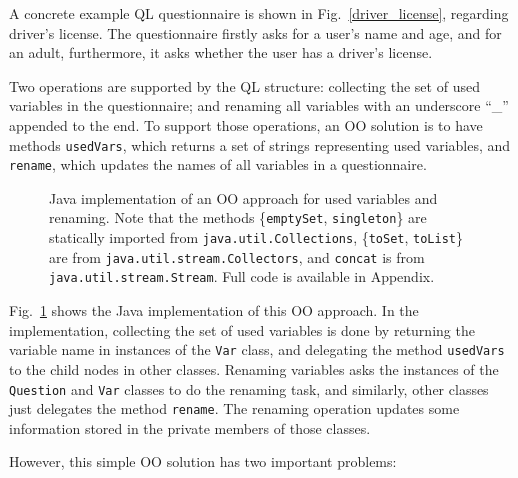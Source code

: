 A concrete example QL questionnaire is shown in Fig.~\ref{driver_license}, regarding driver's license. The questionnaire firstly asks for a user's name and age, and for an adult, furthermore, it asks whether the user has a driver's license.

Two operations are supported by the QL structure: collecting the set of used variables in the questionnaire; and renaming all variables with an underscore ``\_'' appended to the end. To support those operations, an OO solution is to have methods \lstinline{usedVars}, which returns a set of strings representing used variables, and \lstinline{rename}, which updates the names of all variables in a questionnaire.

\begin{figure}[t]
\nocaptionrule
\caption{Java implementation of an OO approach for used variables and renaming. Note that the methods \{\lstinline{emptySet}, \lstinline{singleton}\} are statically imported from \lstinline{java.util.Collections}, \{\lstinline{toSet}, \lstinline{toList}\} are from \lstinline{java.util.stream.Collectors}, and \lstinline{concat} is from \lstinline{java.util.stream.Stream}. Full code is available in Appendix.}
\label{ql_oo_approach}
\end{figure}

Fig.~\ref{ql_oo_approach} shows the Java implementation of this OO approach. In the implementation, collecting the set of used variables is done by returning the variable name in instances of the \lstinline{Var} class, and delegating the method \lstinline{usedVars} to the child nodes in other classes. Renaming variables asks the instances of the \lstinline{Question} and \lstinline{Var} classes to do the renaming task, and similarly, other classes just delegates the method \lstinline{rename}. The renaming operation updates some information stored in the private members of those classes.

However, this simple OO solution has two important problems:

